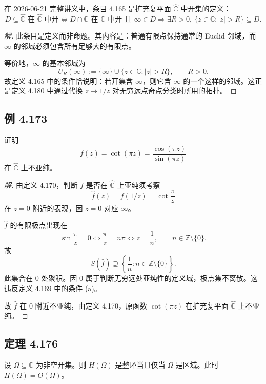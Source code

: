 \documentclass[11pt,a4paper]{article}
\newcommand{\C}{\mathbb{C}}
\newcommand{\Z}{\mathbb{Z}}
\newcommand{\Chat}{\widehat{\C}}
\theoremstyle{definition}
\newenvironment{solution}{\begin{proof}[解]}{\end{proof}}
\begin{document}
在 2026-06-21 完整讲义中，条目 4.165 是扩充复平面 $\Chat$ 中开集的定义：
\[
  D\subseteq \Chat \text{ 在 } \Chat \text{ 中开}
  \iff
  D\cap \C \text{ 在 } \C \text{ 中开}
  \text{ 且 }
  \infty\in D \Rightarrow
  \exists R>0,\ \{z\in\C:|z|>R\}\subseteq D.
\]

\begin{solution}
  此条目是定义而非命题。其内容是：普通有限点保持通常的 Euclid 邻域，而 $\infty$ 的邻域必须包含所有足够大的有限点。

  等价地，$\infty$ 的基本邻域为
  \[
    U_R(\infty):=\{\infty\}\cup\{z\in\C:|z|>R\},
    \qquad R>0.
  \]
  故定义 4.165 中的条件恰说明：若开集含 $\infty$，则它含 $\infty$ 的一个这样的邻域。这正是定义 4.180 中通过代换 $z\mapsto 1/z$ 对无穷远点奇点分类时所用的拓扑。
\end{solution}

\subsection{例 4.173}

证明
\[
  f(z)=\cot(\pi z)=\frac{\cos(\pi z)}{\sin(\pi z)}
\]
在 $\Chat$ 上不亚纯。

\begin{solution}
  由定义 4.170，判断 $f$ 是否在 $\Chat$ 上亚纯须考察
  \[
    \widehat f(z)=f(1/z)=\cot\frac{\pi}{z}
  \]
  在 $z=0$ 附近的表现，因 $z=0$ 对应 $\infty$。

  $\widehat f$ 的有限极点出现在
  \[
    \sin\frac{\pi}{z}=0
    \iff
    \frac{\pi}{z}=n\pi
    \iff
    z=\frac1n,
    \qquad n\in\Z\setminus\{0\}.
  \]
  故
  \[
    S(\widehat f)\supseteq
    \left\{\frac1n:n\in\Z\setminus\{0\}\right\}.
  \]
  此集合在 $0$ 处聚积。因 $0$ 属于判断无穷远处亚纯性的定义域，极点集不离散。这违反定义 4.169 中的条件 (a)。

  故 $\widehat f$ 在 $0$ 附近不亚纯，由定义 4.170，原函数 $\cot(\pi z)$ 在扩充复平面 $\Chat$ 上不亚纯。
\end{solution}

\subsection{定理 4.176}

设 $\Omega\subseteq\C$ 为非空开集。则 $H(\Omega)$ 是整环当且仅当 $\Omega$ 是区域。此时 $H(\Omega)=O(\Omega)$。
\end{document}
